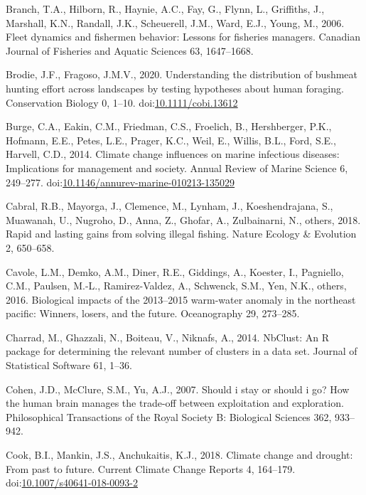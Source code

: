\documentclass[]{elsarticle} %
\begin{document}
\leavevmode\hypertarget{ref-Branch2006}{}%
Branch, T.A., Hilborn, R., Haynie, A.C., Fay, G., Flynn, L., Griffiths,
J., Marshall, K.N., Randall, J.K., Scheuerell, J.M., Ward, E.J., Young,
M., 2006. Fleet dynamics and fishermen behavior: Lessons for fisheries
managers. Canadian Journal of Fisheries and Aquatic Sciences 63,
1647--1668.

\leavevmode\hypertarget{ref-Brodie2020}{}%
Brodie, J.F., Fragoso, J.M.V., 2020. Understanding the distribution of
bushmeat hunting effort across landscapes by testing hypotheses about
human foraging. Conservation Biology 0, 1--10.
doi:\href{https://doi.org/10.1111/cobi.13612}{10.1111/cobi.13612}

\leavevmode\hypertarget{ref-Burge2014}{}%
Burge, C.A., Eakin, C.M., Friedman, C.S., Froelich, B., Hershberger,
P.K., Hofmann, E.E., Petes, L.E., Prager, K.C., Weil, E., Willis, B.L.,
Ford, S.E., Harvell, C.D., 2014. Climate change influences on marine
infectious diseases: Implications for management and society. Annual
Review of Marine Science 6, 249--277.
doi:\href{https://doi.org/10.1146/annurev-marine-010213-135029}{10.1146/annurev-marine-010213-135029}

\leavevmode\hypertarget{ref-Cabral2018}{}%
Cabral, R.B., Mayorga, J., Clemence, M., Lynham, J., Koeshendrajana, S.,
Muawanah, U., Nugroho, D., Anna, Z., Ghofar, A., Zulbainarni, N.,
others, 2018. Rapid and lasting gains from solving illegal fishing.
Nature Ecology \& Evolution 2, 650--658.

\leavevmode\hypertarget{ref-Cavole2016}{}%
Cavole, L.M., Demko, A.M., Diner, R.E., Giddings, A., Koester, I.,
Pagniello, C.M., Paulsen, M.-L., Ramirez-Valdez, A., Schwenck, S.M.,
Yen, N.K., others, 2016. Biological impacts of the 2013--2015 warm-water
anomaly in the northeast pacific: Winners, losers, and the future.
Oceanography 29, 273--285.

\leavevmode\hypertarget{ref-nbclust2014}{}%
Charrad, M., Ghazzali, N., Boiteau, V., Niknafs, A., 2014. NbClust: An R
package for determining the relevant number of clusters in a data set.
Journal of Statistical Software 61, 1--36.

\leavevmode\hypertarget{ref-Cohen2007}{}%
Cohen, J.D., McClure, S.M., Yu, A.J., 2007. Should i stay or should i
go? How the human brain manages the trade-off between exploitation and
exploration. Philosophical Transactions of the Royal Society B:
Biological Sciences 362, 933--942.

\leavevmode\hypertarget{ref-Cook2018}{}%
Cook, B.I., Mankin, J.S., Anchukaitis, K.J., 2018. Climate change and
drought: From past to future. Current Climate Change Reports 4,
164--179.
doi:\href{https://doi.org/10.1007/s40641-018-0093-2}{10.1007/s40641-018-0093-2}
\end{document}
